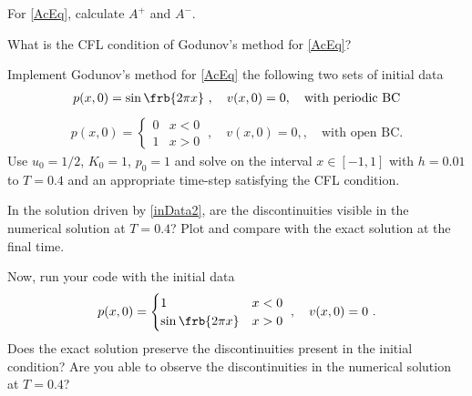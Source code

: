 \documentclass{article}
\begin{document}
\begin{exerciseList}




\item
For \eqref{AcEq}, calculate $A^{+}$ and $A^{-}$. 


\item
What is the CFL condition of Godunov's method for \eqref{AcEq}?


\item
Implement Godunov's method for \eqref{AcEq} the following two sets of initial data
\begin{gather} \label{inData1}
	p(x,0)=\sin\frb{2\pi x}\ ,
	\quad
	v(x,0)=0, \quad \text{with periodic BC}
\end{gather}%
\begin{gather} \label{inData2}
	p(x,0)=\begin{cases}
		0 & x<0\\
		1 & x>0
	\end{cases}\ ,
	\quad
	v(x,0)=0, , \quad \text{with open BC}.
\end{gather}%
Use $u_{0}=1/2$, $K_{0}=1$, $p_{0}=1$ and solve on the interval
$x\in\left[-1,1\right]$ with $h=0.01$ to $T=0.4$ and an appropriate
time-step satisfying the CFL condition.

\item
In the solution driven by \eqref{inData2}, are the discontinuities visible in the numerical solution at $T=0.4$? Plot and compare with the exact solution at the final time.

\item
Now, run your code with the initial data
\begin{gather} \label{inData3}
	p(x,0)=\begin{cases}
		1 & x<0\\
		\sin\frb{2\pi x} & x>0
	\end{cases}\ ,
	\quad
	v(x,0)=0\ .
\end{gather}%
Does the exact solution preserve the discontinuities present in the initial condition? Are you able to observe the discontinuities in the numerical solution at $T=0.4$?





\end{exerciseList}
\end{document}

